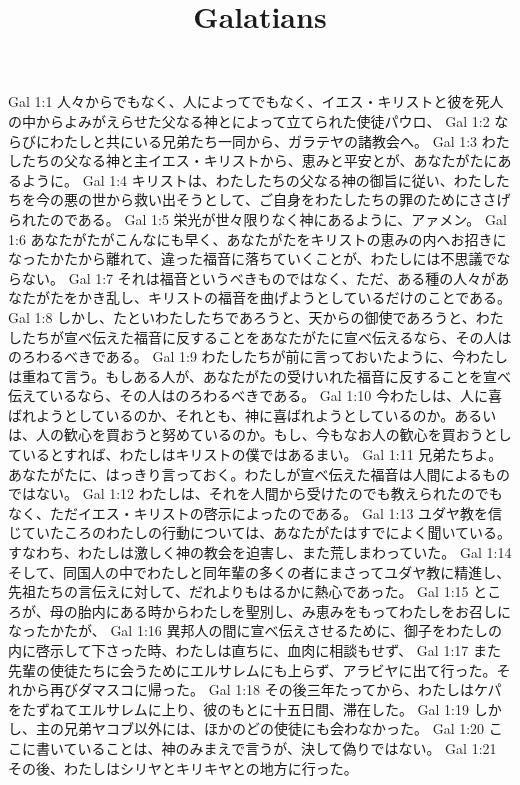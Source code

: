 

\title{Galatians}

Gal 1:1  人々からでもなく、人によってでもなく、イエス・キリストと彼を死人の中からよみがえらせた父なる神とによって立てられた使徒パウロ、
Gal 1:2  ならびにわたしと共にいる兄弟たち一同から、ガラテヤの諸教会へ。
Gal 1:3  わたしたちの父なる神と主イエス・キリストから、恵みと平安とが、あなたがたにあるように。
Gal 1:4  キリストは、わたしたちの父なる神の御旨に従い、わたしたちを今の悪の世から救い出そうとして、ご自身をわたしたちの罪のためにささげられたのである。
Gal 1:5  栄光が世々限りなく神にあるように、アァメン。
Gal 1:6  あなたがたがこんなにも早く、あなたがたをキリストの恵みの内へお招きになったかたから離れて、違った福音に落ちていくことが、わたしには不思議でならない。
Gal 1:7  それは福音というべきものではなく、ただ、ある種の人々があなたがたをかき乱し、キリストの福音を曲げようとしているだけのことである。
Gal 1:8  しかし、たといわたしたちであろうと、天からの御使であろうと、わたしたちが宣べ伝えた福音に反することをあなたがたに宣べ伝えるなら、その人はのろわるべきである。
Gal 1:9  わたしたちが前に言っておいたように、今わたしは重ねて言う。もしある人が、あなたがたの受けいれた福音に反することを宣べ伝えているなら、その人はのろわるべきである。
Gal 1:10  今わたしは、人に喜ばれようとしているのか、それとも、神に喜ばれようとしているのか。あるいは、人の歓心を買おうと努めているのか。もし、今もなお人の歓心を買おうとしているとすれば、わたしはキリストの僕ではあるまい。
Gal 1:11  兄弟たちよ。あなたがたに、はっきり言っておく。わたしが宣べ伝えた福音は人間によるものではない。
Gal 1:12  わたしは、それを人間から受けたのでも教えられたのでもなく、ただイエス・キリストの啓示によったのである。
Gal 1:13  ユダヤ教を信じていたころのわたしの行動については、あなたがたはすでによく聞いている。すなわち、わたしは激しく神の教会を迫害し、また荒しまわっていた。
Gal 1:14  そして、同国人の中でわたしと同年輩の多くの者にまさってユダヤ教に精進し、先祖たちの言伝えに対して、だれよりもはるかに熱心であった。
Gal 1:15  ところが、母の胎内にある時からわたしを聖別し、み恵みをもってわたしをお召しになったかたが、
Gal 1:16  異邦人の間に宣べ伝えさせるために、御子をわたしの内に啓示して下さった時、わたしは直ちに、血肉に相談もせず、
Gal 1:17  また先輩の使徒たちに会うためにエルサレムにも上らず、アラビヤに出て行った。それから再びダマスコに帰った。
Gal 1:18  その後三年たってから、わたしはケパをたずねてエルサレムに上り、彼のもとに十五日間、滞在した。
Gal 1:19  しかし、主の兄弟ヤコブ以外には、ほかのどの使徒にも会わなかった。
Gal 1:20  ここに書いていることは、神のみまえで言うが、決して偽りではない。
Gal 1:21  その後、わたしはシリヤとキリキヤとの地方に行った。
